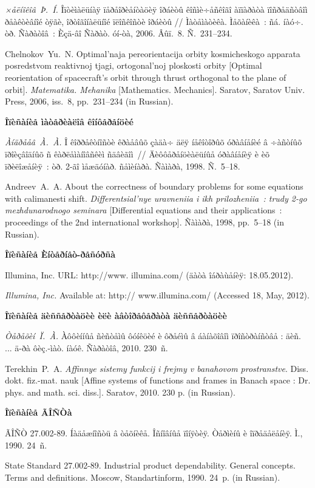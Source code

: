 \documentclass[12pt]{book}
\theoremstyle{plain}
\theoremstyle{remark}
\theoremstyle{plain}
\theoremstyle{definition}
\begin{document}
\textit{×åëíîêîâ~Þ.~Í.} Îïòèìàëüíàÿ ïåðåîðèåíòàöèÿ îðáèòû
êîñìè÷åñêîãî àïïàðàòà ïîñðåäñòâîì ðåàêòèâíîé òÿãè, îðòîãîíàëüíîé
ïëîñêîñòè îðáèòû // Ìàòåìàòèêà. Ìåõàíèêà~: ñá. íàó÷. òð. Ñàðàòîâ~:
Èçä-âî Ñàðàò. óí-òà, 2006. Âûï.~8. Ñ.~231--234.

Chelnokov~Yu.~N. Optimal'naja pereorientacija orbity
kosmicheskogo apparata posredstvom reaktivnoj tjagi, ortogonal'noj
ploskosti orbity [Optimal reorientation of spacecraft's orbit
through thrust orthogonal to the plane of orbit].
\textit{Matematika. Mehanika} [Mathematics. Mechanics]. Saratov,
Saratov Univ. Press, 2006, iss.~8, pp.~231--234 (in Russian).

\textbf{Îïèñàíèå ìàòåðèàëîâ êîíôåðåíöèé}

\textit{Àíäðååâ~À.~À.} Î êîððåêòíîñòè êðàåâûõ çàäà÷ äëÿ
íåêîòîðûõ óðàâíåíèé â ÷àñòíûõ ïðîèçâîäíûõ ñ êàðëåìàíîâñêèì
ñäâèãîì~// Äèôôåðåíöèàëüíûå óðàâíåíèÿ è èõ ïðèëîæåíèÿ~: òð. 2-ãî
ìåæäóíàð. ñåìèíàðà. Ñàìàðà, 1998. Ñ.~5--18.

Andreev~A.~A. About the correctness of boundary problems for
some equations with calimanesti shift. \textit{Differentsial'nye
uravneniia i ikh prilozheniia~: trudy 2-go mezhdunarodnogo
seminara} [Differential equations and their applications~:
proceedings of the 2nd international workshop]. Ñàìàðà, 1998,
pp.~5--18 (in Russian).


\textbf{Îïèñàíèå Èíòåðíåò-ðåñóðñà}

Illumina, Inc. URL: http://www. illumina.com/  (äàòà
îáðàùåíèÿ: 18.05.2012).

\textit{Illumina, Inc.} Available at: http://
www.illumina.com/  (Accessed  18, May, 2012).

\textbf{Îïèñàíèå äèññåðòàöèè èëè àâòîðåôåðàòà äèññåðòàöèè}

\textit{Òåðåõèí~Ï.~À.} Àôôèííûå ñèñòåìû ôóíêöèé è ôðåéìû â
áàíàõîâîì ïðîñòðàíñòâå : äèñ. ... ä-ðà ôèç.-ìàò. íàóê. Ñàðàòîâ,
2010. 230~ñ.

Terekhin~P.~A. \textit{Affinnye sistemy funkcij i frejmy v
banahovom prostranstve}. Diss. dokt. fiz.-mat. nauk [Affine
systems of functions and frames in Banach space : Dr. phys. and
math. sci. diss.]. Saratov, 2010. 230 p. (in Russian).

\textbf{Îïèñàíèå ÃÎÑÒà}

ÃÎÑÒ 27.002-89. Íàäåæíîñòü â òåõíèêå. Îñíîâíûå ïîíÿòèÿ.
Òåðìèíû è îïðåäåëåíèÿ. Ì., 1990. 24~ñ.

State Standard 27.002-89. Industrial product dependability.
General concepts. Terms and definitions. Moscow, Standartinform,
1990. 24~p. (in Russian).
\end{document}
